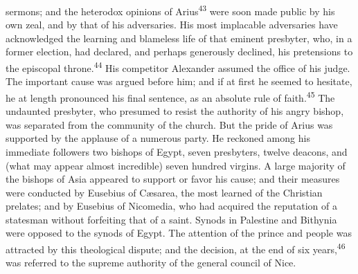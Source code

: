 sermons; and the heterodox opinions of Arius\textsuperscript{43} were soon made
public by his own zeal, and by that of his adversaries. His most
implacable adversaries have acknowledged the learning and
blameless life of that eminent presbyter, who, in a former
election, had declared, and perhaps generously declined, his
pretensions to the episcopal throne.\textsuperscript{44} His competitor Alexander
assumed the office of his judge. The important cause was argued
before him; and if at first he seemed to hesitate, he at length
pronounced his final sentence, as an absolute rule of faith.\textsuperscript{45}
The undaunted presbyter, who presumed to resist the authority of
his angry bishop, was separated from the community of the church.
But the pride of Arius was supported by the applause of a
numerous party. He reckoned among his immediate followers two
bishops of Egypt, seven presbyters, twelve deacons, and (what may
appear almost incredible) seven hundred virgins. A large majority
of the bishops of Asia appeared to support or favor his cause;
and their measures were conducted by Eusebius of Cæsarea, the
most learned of the Christian prelates; and by Eusebius of
Nicomedia, who had acquired the reputation of a statesman without
forfeiting that of a saint. Synods in Palestine and Bithynia were
opposed to the synods of Egypt. The attention of the prince and
people was attracted by this theological dispute; and the
decision, at the end of six years,\textsuperscript{46} was referred to the supreme
authority of the general council of Nice.






